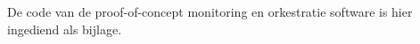 
\chapter{}%
\label{ch:code}
De code van de proof-of-concept monitoring en orkestratie software is hier ingediend als bijlage.
